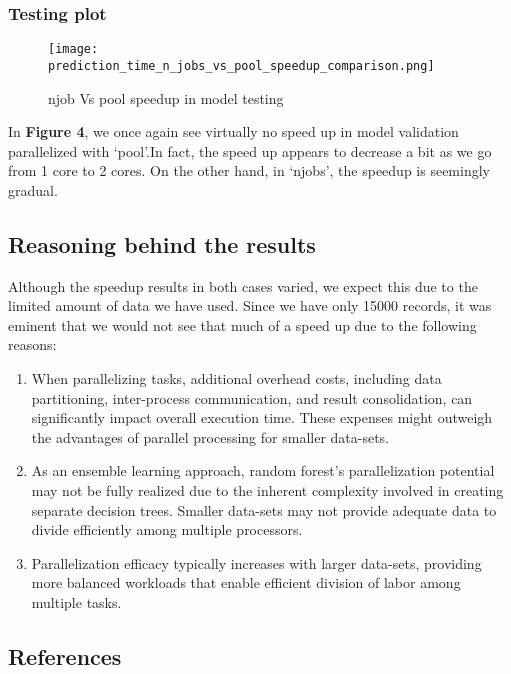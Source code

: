 \documentclass{article}
\begin{document}
\subsubsection{Testing plot}
\begin{figure}[H]
    \centering
    \texttt{[image: prediction\_time\_n\_jobs\_vs\_pool\_speedup\_comparison.png]}
    \caption{n\textunderscore{}job Vs pool speedup in model testing}
    \label{fig:enter-label}
\end{figure}

In \textbf{Figure 4}, we once again see virtually no speed up in model validation parallelized with `pool'.In fact, the speed up appears to decrease a bit as we go from 1 core to 2 cores. On the other hand, in `n\textunderscore{}jobs', the speedup  is seemingly gradual. 

\subsection{Reasoning behind the results}
Although the speedup results in both cases varied, we expect this due to the limited amount of data we have used. Since we have only 15000 records, it was eminent that we would not see that much of a speed up due to the following reasons:

\begin{enumerate}
\item When parallelizing tasks, additional overhead costs, including data partitioning, inter-process communication, and result consolidation, can significantly impact overall execution time. These expenses might outweigh the advantages of parallel processing for smaller data-sets.
\item As an ensemble learning approach, random forest's parallelization potential may not be fully realized due to the inherent complexity involved in creating separate decision trees. Smaller data-sets may not provide adequate data to divide efficiently among multiple processors.
\item Parallelization efficacy typically increases with larger data-sets, providing more balanced workloads that enable efficient division of labor among multiple tasks.
\end{enumerate}
\subsection{References}
\end{document}
